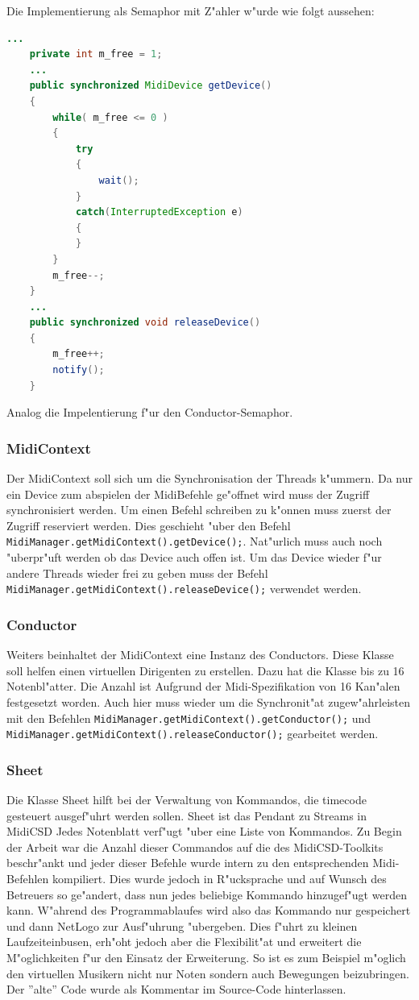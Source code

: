 Die Implementierung als Semaphor mit Z"ahler w"urde wie folgt aussehen:
\begin{lstlisting}[language=Java,basicstyle=\small]
	...
	private int m_free = 1;
	...
	public synchronized MidiDevice getDevice()
	{
		while( m_free <= 0 )
		{
			try
			{
				wait();
			}
			catch(InterruptedException e)
			{
			}
		}
		m_free--;
	}
	...
	public synchronized void releaseDevice()
	{
		m_free++;
		notify();
	}
\end{lstlisting}
Analog die Impelentierung f"ur den Conductor-Semaphor. 
\subsubsection{MidiContext}
Der MidiContext soll sich um die Synchronisation der Threads k"ummern. Da nur
ein Device zum abspielen der MidiBefehle ge"offnet wird muss der Zugriff 
synchronisiert werden. Um einen Befehl schreiben zu k"onnen muss zuerst der
Zugriff reserviert werden. Dies geschieht "uber den Befehl
\lstinline|MidiManager.getMidiContext().getDevice();|. Nat"urlich muss auch noch
"uberpr"uft werden ob das Device auch offen ist. Um das Device wieder f"ur andere
Threads wieder frei zu geben muss der Befehl
\lstinline|MidiManager.getMidiContext().releaseDevice();| verwendet werden. 

\subsubsection{Conductor}
Weiters beinhaltet der MidiContext eine Instanz des Conductors. Diese Klasse 
soll helfen einen virtuellen Dirigenten zu erstellen. Dazu hat die Klasse 
bis zu 16 Notenbl"atter. Die Anzahl ist Aufgrund der Midi-Spezifikation von
16 Kan"alen festgesetzt worden. Auch hier muss wieder um die Synchronit"at 
zugew"ahrleisten mit den Befehlen \lstinline|MidiManager.getMidiContext().getConductor();|
und \lstinline|MidiManager.getMidiContext().releaseConductor();| gearbeitet 
werden. 

\subsubsection{Sheet}
Die Klasse Sheet hilft bei der Verwaltung von Kommandos, die timecode gesteuert
ausgef"uhrt werden sollen. Sheet ist das Pendant zu Streams in MidiCSD \cite{MidiCSD}
Jedes Notenblatt verf"ugt "uber eine Liste von Kommandos. Zu Begin der Arbeit
war die Anzahl dieser Commandos auf die des MidiCSD-Toolkits beschr"ankt und 
jeder dieser Befehle wurde intern zu den entsprechenden Midi-Befehlen kompiliert.
Dies wurde jedoch in R"ucksprache und auf Wunsch des Betreuers so ge"andert, 
dass nun jedes beliebige Kommando hinzugef"ugt werden kann. W"ahrend des
Programmablaufes wird also das Kommando nur gespeichert und dann NetLogo zur
Ausf"uhrung "ubergeben. Dies f"uhrt zu kleinen Laufzeiteinbusen, erh"oht jedoch
aber die Flexibilit"at und erweitert die M"oglichkeiten f"ur den Einsatz der 
Erweiterung. So ist es zum Beispiel m"oglich den virtuellen Musikern nicht nur
Noten sondern auch Bewegungen beizubringen. 
Der ''alte'' Code wurde als Kommentar im Source-Code hinterlassen. 

